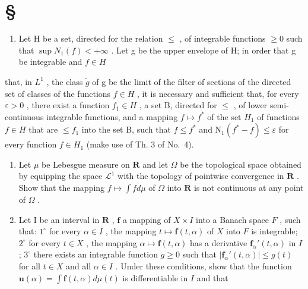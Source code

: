\section*{\texorpdfstring{\S\CurrentExerciseGroup}{Section \CurrentExerciseGroup}}
{}

\begin{enumerate}
\def\labelenumi{\arabic{enumi})}
\tightlist
\item
  Let H be a set, directed for the relation \(\leqslant\) , of integrable functions \(\geqslant 0\) such that \(\sup N_{1}(f) < +\infty\) . Let g be the upper envelope of H; in order that g be integrable and \(f \in H\)
\end{enumerate}

that, in \(L^{1}\) , the class \(\widetilde{g}\) of g be the limit of the filter of sections of the directed set of classes of the functions \(f \in H\) , it is necessary and sufficient that, for every \(\varepsilon > 0\) , there exist a function \(f_{1} \in H\) , a set B, directed for \(\leqslant\) , of lower semi-continuous integrable functions, and a mapping \(f \mapsto f^{*}\) of the set \(H_{1}\) of functions \(f \in H\) that are \(\leqslant f_{1}\) into the set B, such that \(f \leqslant f^{*}\) and \(\mathrm{N}_{1}(f^{*} - f) \leqslant \varepsilon\) for every function \(f \in H_{1}\) (make use of Th. 3 of No.~4).

\begin{enumerate}
\def\labelenumi{\arabic{enumi})}
\setcounter{enumi}{1}
\item
  Let \(\mu\) be Lebesgue measure on \(\mathbf{R}\) and let \(\Omega\) be the topological space obtained by equipping the space \(\mathcal{L}^1\) with the topology of pointwise convergence in \(\mathbf{R}\) . Show that the mapping \(f\mapsto \int fd\mu\) of \(\Omega\) into \(\mathbf{R}\) is not continuous at any point of \(\Omega\) .
\item
  Let I be an interval in \(\mathbf{R}\) , \(\mathbf{f}\) a mapping of \(X \times I\) into a Banach space \(F\) , such that: \(1^{\circ}\) for every \(\alpha \in I\) , the mapping \(t \mapsto \mathbf{f}(t, \alpha)\) of \(X\) into \(F\) is integrable; \(2^{\circ}\) for every \(t \in X\) , the mapping \(\alpha \mapsto \mathbf{f}(t, \alpha)\) has a derivative \(\mathbf{f}_{\alpha}'(t, \alpha)\) in \(I\) ; \(3^{\circ}\) there exists an integrable function \(g \geqslant 0\) such that \(|\mathbf{f}_{\alpha}'(t, \alpha)| \leqslant g(t)\) for all \(t \in X\) and all \(\alpha \in I\) . Under these conditions, show that the function \(\mathbf{u}(\alpha) = \int \mathbf{f}(t, \alpha) d\mu(t)\) is differentiable in \(I\) and that
\end{enumerate}

